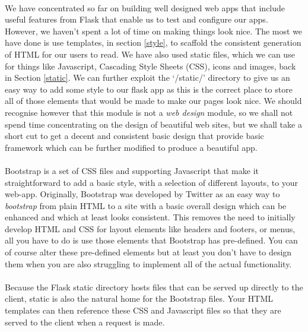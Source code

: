 \documentclass[12pt, a4paper, oneside]{book}
\begin{document}
{\paragraph{} We have concentrated so far on building well designed web apps that include useful features from Flask that enable us to test and configure our apps. However, we haven't spent a lot of time on making things look nice. The most we have done is use templates, in section \ref{style}, to scaffold the consistent generation of HTML for our users to read. We have also used static files, which we can use for things like Javascript, Cascading Style Sheets (CSS), icons and images, back in Section \ref{static}. We can further exploit the `/static/' directory to give us an easy way to add some style to our flask app as this is the correct place to store all of those elements that would be made to make our pages look nice. We should recognise however that this module is not a \emph{web design} module, so we shall not spend time concentrating on the design of beautiful web sites, but we shall take a short cut to get a decent and consistent basic design that provide basic framework which can be further modified to produce a beautiful app.

\paragraph{} Bootstrap is a set of CSS files and supporting Javascript that make it straightforward to add a basic style, with a selection of different layouts, to your web-app. Originally, Bootstrap was developed by Twitter as an easy way to \emph{bootstrap} from plain HTML to a site with a basic overall design which can be enhanced and which at least looks consistent. This removes the need to initially develop HTML and CSS for layout elements like headers and footers, or menus, all you have to do is use those elements that Bootstrap has pre-defined. You can of course alter these pre-defined elements but at least you don't have to design them when you are also struggling to implement all of the actual functionality.

\paragraph{} Because the Flask static directory hosts files that can be served up directly to the client, static is also the natural home for the Bootstrap files. Your HTML templates can then reference these CSS and Javascript files so that they are served to the client when a request is made.

}
\end{document}
